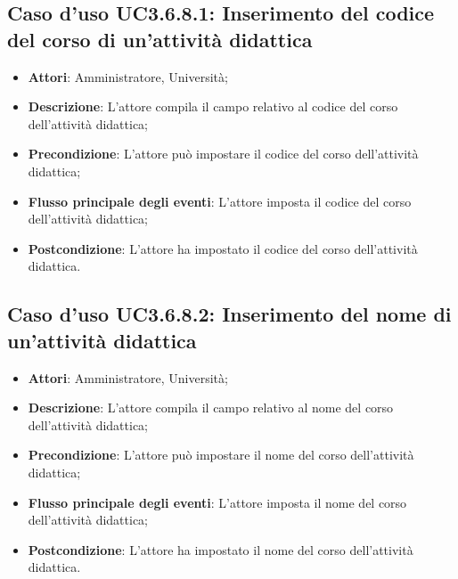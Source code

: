 \subsection{Caso d'uso \texorpdfstring{UC3.6.8.1}{UC3.6.8.1}: Inserimento del codice del corso di un'attività didattica}
\begin{itemize}
\item \textbf{Attori}: Amministratore, Università;
\item \textbf{Descrizione}: L'attore compila il campo relativo al codice del corso dell'attività didattica;

\item \textbf{Precondizione}: L'attore può impostare il codice del corso dell'attività didattica;

\item \textbf{Flusso principale degli eventi}: L'attore imposta il codice del corso dell'attività didattica;

\item \textbf{Postcondizione}: L'attore ha impostato il codice del corso dell'attività didattica.

\end{itemize}
\subsection{Caso d'uso \texorpdfstring{UC3.6.8.2}{UC3.6.8.2}: Inserimento del nome di un’attività didattica}
\begin{itemize}
\item \textbf{Attori}: Amministratore, Università;
\item \textbf{Descrizione}: L'attore compila il campo relativo al nome del corso dell'attività didattica;

\item \textbf{Precondizione}: L'attore può impostare il nome del corso dell'attività didattica;

\item \textbf{Flusso principale degli eventi}: L'attore imposta il nome del corso dell'attività didattica;

\item \textbf{Postcondizione}: L'attore ha impostato il nome del corso dell'attività didattica.

\end{itemize}

